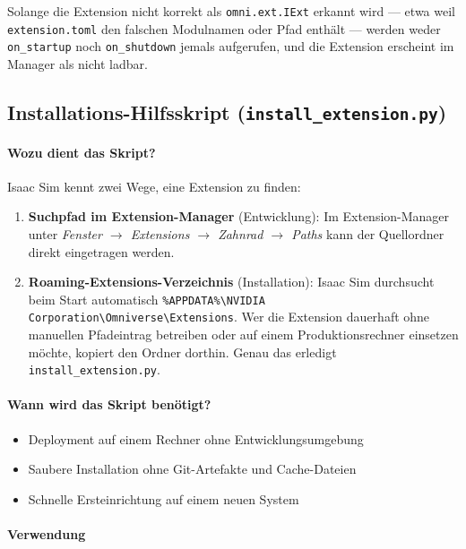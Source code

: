 \documentclass[11pt,a4paper]{article}
\begin{document}
Solange die Extension nicht korrekt als \texttt{omni.ext.IExt}
erkannt wird --- etwa weil \texttt{extension.toml} den falschen
Modulnamen oder Pfad enthält --- werden weder \texttt{on\_startup}
noch \texttt{on\_shutdown} jemals aufgerufen, und die Extension
erscheint im Manager als nicht ladbar.

\subsection{Installations-Hilfsskript (\texttt{install\_extension.py})}

\paragraph{Wozu dient das Skript?}

Isaac Sim kennt zwei Wege, eine Extension zu finden:

\begin{enumerate}
  \item \textbf{Suchpfad im Extension-Manager} (Entwicklung):
        Im Extension-Manager unter
        \textit{Fenster $\to$ Extensions $\to$ Zahnrad $\to$ Paths}
        kann der Quellordner direkt eingetragen werden.

  \item \textbf{Roaming-Extensions-Verzeichnis} (Installation):
        Isaac Sim durchsucht beim Start automatisch
        \texttt{\%APPDATA\%\textbackslash{}NVIDIA Corporation\textbackslash{}Omniverse\textbackslash{}Extensions}.
        Wer die Extension dauerhaft ohne manuellen Pfadeintrag
        betreiben oder auf einem Produktionsrechner einsetzen möchte,
        kopiert den Ordner dorthin. Genau das erledigt
        \texttt{install\_extension.py}.
\end{enumerate}

\paragraph{Wann wird das Skript benötigt?}

\begin{itemize}
  \item Deployment auf einem Rechner ohne Entwicklungsumgebung
  \item Saubere Installation ohne Git-Artefakte und Cache-Dateien
  \item Schnelle Ersteinrichtung auf einem neuen System
\end{itemize}

\paragraph{Verwendung}
\end{document}
